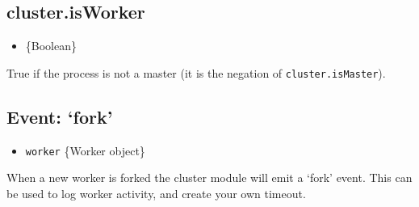 \subsection{cluster.isWorker}\label{cluster.isworker}

\begin{itemize}
\itemsep1pt\parskip0pt
\item
  \{Boolean\}
\end{itemize}

True if the process is not a master (it is the negation of
\texttt{cluster.isMaster}).

\subsection{Event: `fork'}\label{event-fork}

\begin{itemize}
\itemsep1pt\parskip0pt
\item
  \texttt{worker} \{Worker object\}
\end{itemize}

When a new worker is forked the cluster module will emit a `fork' event.
This can be used to log worker activity, and create your own timeout.

\begin{Shaded}
\begin{Highlighting}[]
 
 \NormalTok{() \{}
  \NormalTok{(}\NormalTok{);}
\NormalTok{\}}

\NormalTok{(}\NormalTok{, }
  \NormalTok{timeouts[}\NormalTok{] = }\NormalTok{);}
\NormalTok{\});}
\NormalTok{(}\NormalTok{, }
  \NormalTok{(timeouts[}\NormalTok{]);}
\NormalTok{\});}
\NormalTok{(}\NormalTok{, }
  \NormalTok{(timeouts[}\NormalTok{]);}
  \NormalTok{();}
\NormalTok{\});}
\end{Highlighting}
\end{Shaded}

